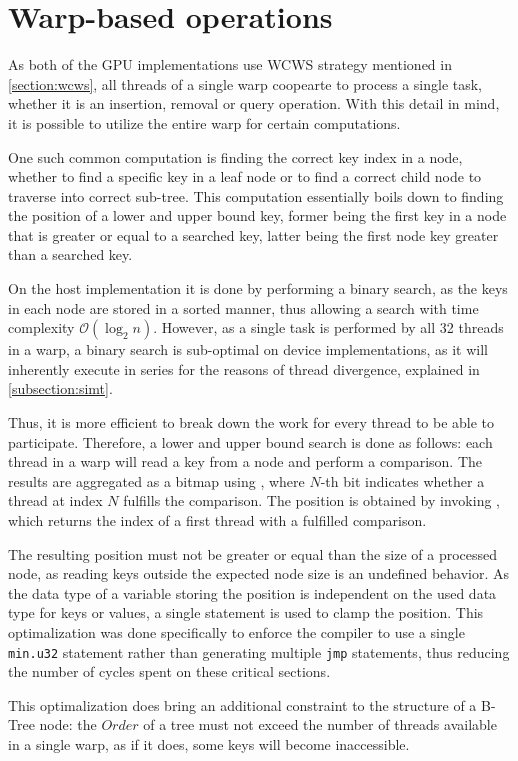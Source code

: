 \section{Warp-based operations}

As both of the GPU implementations use WCWS strategy mentioned in \cref{section:wcws}, all threads of a single warp coopearte to process a single task, whether it is an insertion, removal or query operation. With this detail in mind, it is possible to utilize the entire warp for certain computations.

One such common computation is finding the correct key index in a node, whether to find a specific key in a leaf node or to find a correct child node to traverse into correct sub-tree. This computation essentially boils down to finding the position of a lower and upper bound key, former being the first key in a node that is greater or equal to a searched key, latter being the first node key greater than a searched key.


On the host implementation it is done by performing a binary search, as the keys in each node are stored in a sorted manner, thus allowing a search with time complexity $\mathcal{O}(\log_2 n)$. However, as a single task is performed by all 32 threads in a warp, a binary search is sub-optimal on device implementations, as it will inherently execute in series for the reasons of thread divergence, explained in \cref{subsection:simt}.


Thus, it is more efficient to break down the work for every thread to be able to participate. Therefore, a lower and upper bound search is done as follows: each thread in a warp will read a key from a node and perform a comparison. The results are aggregated as a bitmap using , where $N$-th bit indicates whether a thread at index $N$ fulfills the comparison. The position is obtained by invoking , which returns the index of a first thread with a fulfilled comparison.

The resulting position must not be greater or equal than the size of a processed node, as reading keys outside the expected node size is an undefined behavior. As the data type of a variable storing the position is independent on the used data type for keys or values, a single  statement is used to clamp the position. This optimalization was done specifically to enforce the compiler to use a single \texttt{min.u32} statement rather than generating multiple \texttt{jmp} statements, thus reducing the number of cycles spent on these critical sections.

This optimalization does bring an additional constraint to the structure of a B-Tree node: the $Order$ of a tree must not exceed the number of threads available in a single warp, as if it does, some keys will become inaccessible.
